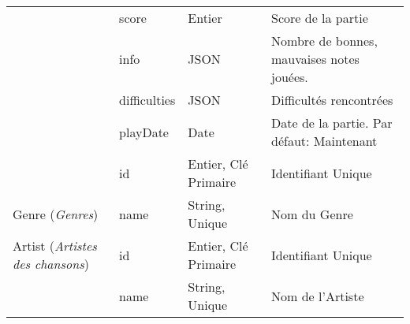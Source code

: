 \begin{longtable}[c]{@{}|p{}|p{}|p{}|p{}|@{}}
														& score                                                & Entier                                                                                   & Score de la partie                                                                       \\* \cline{2-4} 
														& info                                                 & JSON                                                                                     & Nombre de bonnes, mauvaises notes jouées.                                                \\* \cline{2-4} 
														& difficulties                                         & JSON                                                                                     & Difficultés rencontrées                                                                 \\* \cline{2-4} 
								                        & playDate                                             & Date                                                                                     & Date de la partie. Par défaut: Maintenant                                                \\* \hline
														& id                                                   & Entier, Clé Primaire                                                                     & Identifiant Unique                                                                       \\* \cline{2-4} 
	\multirow{-2}{0.18\textwidth}{Genre (\textit{Genres})}                             & name                                                 & String, Unique                                                                           & Nom du Genre                                                                             \\* \hline
	\multirow{-1}{0.18\textwidth}{Artist (\textit{Artistes des chansons})}							& id                                                   & Entier, Clé Primaire                                                                     & Identifiant Unique                                                                       \\* \cline{2-4} 
								                            & name                                                 & String, Unique                                                                           & Nom de l’Artiste                                                                         \\* \hline

\end{longtable}
